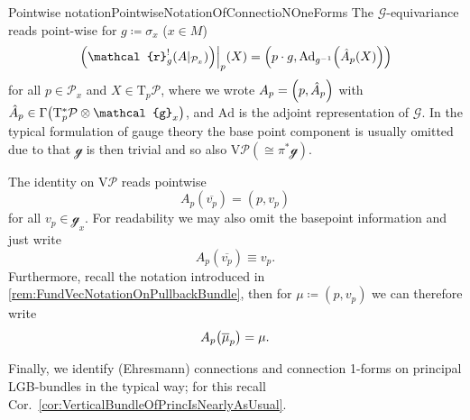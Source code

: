 \documentclass[reqno,a4paper,oneside]{amsart}
\theoremstyle{plain}
\theoremstyle{remark}
\theoremstyle{definition}
\begin{document}
\begin{remarks}{Pointwise notation}{PointwiseNotationOfConnectioNOneForms}
The $\mathcal{G}$-equivariance reads point-wise for $g \coloneqq \sigma_x$ ($x\in M$)
\begin{equation*}
\mleft.\mleft(\mathcal{r}_g^! \mleft(A|_{\mathcal{P}_x}\mright)\mright)\mright|_{p}(X)
=
\mleft(
	p \cdot g, 
	\mathrm{Ad}_{g^{-1}}\mleft( \hat{A}_p(X) \mright)
\mright)
\end{equation*}
for all $p \in \mathcal{P}_x$ and $X \in \mathrm{T}_p\mathcal{P}$,
where we wrote $A_p = \mleft(p, \hat{A}_p\mright)$ with $\hat{A}_p \in \Gamma\mleft( \mathrm{T}^*_p\mathcal{P} \otimes \mathcal{g}_x \mright)$, and $\mathrm{Ad}$ is the adjoint representation of $\mathcal{G}$. In the typical formulation of gauge theory the base point component is usually omitted due to that $\mathcal{g}$ is then trivial and so also $\mathrm{V}\mathcal{P} (\cong \pi^*\mathcal{g})$.

The identity on $\mathrm{V}\mathcal{P}$ reads pointwise
\begin{equation*}
A_p(\overline{v_p})
=
(p, v_p)
\end{equation*}
for all $v_p \in \mathcal{g}_x$. For readability we may also omit the basepoint information and just write
\begin{equation*}
A_p(\overline{v_p})
\equiv
v_p.
\end{equation*}
Furthermore, recall the notation introduced in \ref{rem:FundVecNotationOnPullbackBundle}, then for $\mu \coloneqq (p, v_p)$ we can therefore write
\begin{equation*}
A_p\mleft( \overline{\mu}_p \mright)
=
\mu.
\end{equation*}
\end{remarks}

Finally, we identify (Ehresmann) connections and connection 1-forms on principal LGB-bundles in the typical way; for this recall Cor.\ \ref{cor:VerticalBundleOfPrincIsNearlyAsUsual}.
\end{document}

